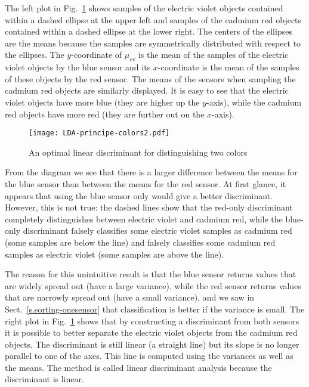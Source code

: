 The left plot in Fig.~\ref{fig.LDAprincipe} shows samples of the electric violet objects contained within a dashed ellipse at the upper left and samples of the cadmium red objects contained within a dashed ellipse at the lower right. The centers of the ellipses are the means because the samples are symmetrically distributed with respect to the ellipses. The $y$-coordinate of $\mu_{ev}$ is the mean of the samples of the electric violet objects by the blue sensor and its $x$-coordinate is the mean of the samples of these objects by the red sensor. The means of the sensors when sampling the cadmium red objects are similarly displayed. It is easy to see  that the electric violet objects have more blue (they are higher up the $y$-axis), while the cadmium red objects have more red (they are further out on the $x$-axis).

\begin{figure}
\begin{center}
\texttt{[image: LDA-principe-colors2.pdf]}
\end{center}
\caption{An optimal linear discriminant for distinguishing two colors}\label{fig.LDAprincipe}
\end{figure}

From the diagram we see that there is a larger difference between the means for the blue sensor than between the means for the red sensor. At first glance, it appears that using the blue sensor only would give a better discriminant. However, this is not true: the dashed lines show that the red-only discriminant completely distinguishes between electric violet and cadmium red, while the blue-only discriminant falsely classifies some electric violet samples as cadmium red (some samples are below the line) and falsely classifies some cadmium red samples as electric violet (some samples are above the line).

The reason for this unintuitive result is that the blue sensor returns values that are widely spread out (have a large variance), while the red sensor returns values that are narrowly spread out (have a small variance), and we saw in Sect.~\ref{s.sorting-onesensor} that classification is better if the variance is small. The right plot in Fig.~\ref{fig.LDAprincipe} shows that by constructing a discriminant from both sensors it is possible to better separate the electric violet objects from the cadmium red objects. The discriminant is still linear (a straight line) but its slope is no longer parallel to one of the axes. This line is computed using the variances as well as the means. The method is called linear discriminant analysis because the discriminant is linear.


